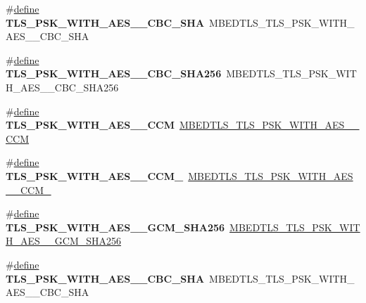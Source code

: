 \begin{DoxyCompactItemize}
\item 
\mbox{\label{compat-1_83_8h_ac2b351a80dba61fd99ce858986b9ce7b}} 
\#\hyperlink{structdefine}{define} {\bfseries T\+L\+S\+\_\+\+P\+S\+K\+\_\+\+W\+I\+T\+H\+\_\+\+A\+E\+S\+\_\+\_\+\+C\+B\+C\+\_\+\+S\+HA}~M\+B\+E\+D\+T\+L\+S\+\_\+\+T\+L\+S\+\_\+\+P\+S\+K\+\_\+\+W\+I\+T\+H\+\_\+\+A\+E\+S\+\_\+\_\+\+C\+B\+C\+\_\+\+S\+HA
\item 
\mbox{\label{compat-1_83_8h_a1676d111553c1755ca80e87b79408679}} 
\#\hyperlink{structdefine}{define} {\bfseries T\+L\+S\+\_\+\+P\+S\+K\+\_\+\+W\+I\+T\+H\+\_\+\+A\+E\+S\+\_\+\_\+\+C\+B\+C\+\_\+\+S\+H\+A256}~M\+B\+E\+D\+T\+L\+S\+\_\+\+T\+L\+S\+\_\+\+P\+S\+K\+\_\+\+W\+I\+T\+H\+\_\+\+A\+E\+S\+\_\+\_\+\+C\+B\+C\+\_\+\+S\+H\+A256
\item 
\mbox{\label{compat-1_83_8h_ab21d1b41ce789950742e80045c788366}} 
\#\hyperlink{structdefine}{define} {\bfseries T\+L\+S\+\_\+\+P\+S\+K\+\_\+\+W\+I\+T\+H\+\_\+\+A\+E\+S\+\_\+\_\+\+C\+CM}~\hyperlink{ssl__ciphersuites_8h_aca8fbd49efcde7d69143a64d337eeff4}{M\+B\+E\+D\+T\+L\+S\+\_\+\+T\+L\+S\+\_\+\+P\+S\+K\+\_\+\+W\+I\+T\+H\+\_\+\+A\+E\+S\+\_\+\_\+\+C\+CM}
\item 
\mbox{\label{compat-1_83_8h_aff0da1b90c7430294fd9f04e3f0e1ca3}} 
\#\hyperlink{structdefine}{define} {\bfseries T\+L\+S\+\_\+\+P\+S\+K\+\_\+\+W\+I\+T\+H\+\_\+\+A\+E\+S\+\_\+\_\+\+C\+C\+M\+\_}~\hyperlink{ssl__ciphersuites_8h_a2633488de6be17d4a5b004f8ab9f95e0}{M\+B\+E\+D\+T\+L\+S\+\_\+\+T\+L\+S\+\_\+\+P\+S\+K\+\_\+\+W\+I\+T\+H\+\_\+\+A\+E\+S\+\_\+\_\+\+C\+C\+M\+\_}
\item 
\mbox{\label{compat-1_83_8h_a7186ff3897daf03d2da7b9d5768e63ec}} 
\#\hyperlink{structdefine}{define} {\bfseries T\+L\+S\+\_\+\+P\+S\+K\+\_\+\+W\+I\+T\+H\+\_\+\+A\+E\+S\+\_\+\_\+\+G\+C\+M\+\_\+\+S\+H\+A256}~\hyperlink{ssl__ciphersuites_8h_a59e8a3af727d077b47322d90a5592001}{M\+B\+E\+D\+T\+L\+S\+\_\+\+T\+L\+S\+\_\+\+P\+S\+K\+\_\+\+W\+I\+T\+H\+\_\+\+A\+E\+S\+\_\+\_\+\+G\+C\+M\+\_\+\+S\+H\+A256}
\item 
\mbox{\label{compat-1_83_8h_ace82139ba8e6700726abfa5c77245fbe}} 
\#\hyperlink{structdefine}{define} {\bfseries T\+L\+S\+\_\+\+P\+S\+K\+\_\+\+W\+I\+T\+H\+\_\+\+A\+E\+S\+\_\+\_\+\+C\+B\+C\+\_\+\+S\+HA}~M\+B\+E\+D\+T\+L\+S\+\_\+\+T\+L\+S\+\_\+\+P\+S\+K\+\_\+\+W\+I\+T\+H\+\_\+\+A\+E\+S\+\_\+\_\+\+C\+B\+C\+\_\+\+S\+HA

\end{DoxyCompactItemize}
